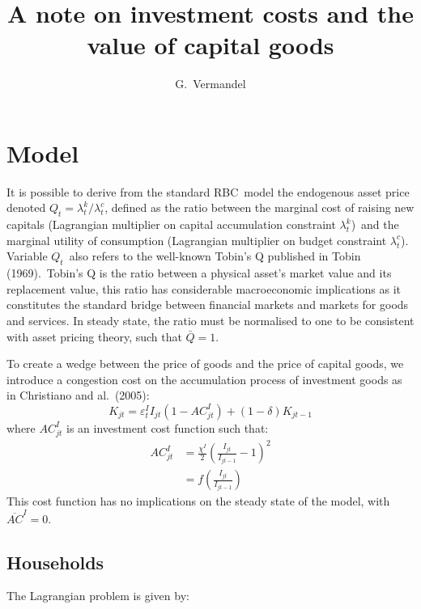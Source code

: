 \documentclass{article}%
\begin{document}
\title{A note on investment costs and the value of capital goods}
\author{G.\ Vermandel}
\maketitle

\section{Model}

It is possible to derive from the standard RBC\ model the endogenous asset
price denoted $Q_{t}=\lambda_{t}^{k}/\lambda_{t}^{c}$, defined as the ratio
between the marginal cost of raising new capitals (Lagrangian multiplier on
capital accumulation constraint $\lambda_{t}^{k}$)\ and the marginal utility
of consumption (Lagrangian multiplier on budget constraint $\lambda_{t}^{c}$).
Variable $Q_{t}$\ also refers to the well-known Tobin's Q published in Tobin
(1969).\ Tobin's Q is the ratio between a physical asset's market value and
its replacement value, this ratio has considerable macroeconomic implications
as it constitutes the standard bridge between financial markets and markets
for goods and services. In steady state, the ratio must be normalised to one
to be consistent with asset pricing theory, such that $\bar{Q}=1$.

To create a wedge between the price of goods and the price of capital goods,
we introduce a congestion cost on the accumulation process of investment goods
as in Christiano and al.\ (2005):%
\begin{equation}
K_{jt}=\varepsilon_{t}^{I}I_{jt}\left(  1-AC_{jt}^{I}\right)  +\left(
1-\delta\right)  K_{jt-1}%
\end{equation}
where $AC_{jt}^{I}$ is an investment cost function such that:%
\begin{align}
AC_{jt}^{I}  &  =\frac{\chi^{I}}{2}\left(  \frac{I_{jt}}{I_{jt-1}}-1\right)
^{2}\\
&  =f\left(  \frac{I_{jt}}{I_{jt-1}}\right)
\end{align}
This cost function has no implications on the steady state of the model, with
$\overline{AC}^{I}=0$.

\subsection{Households}

The Lagrangian problem is given by:%
\end{document}
